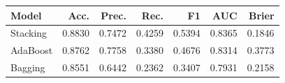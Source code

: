 \begin{tabular*}{\textwidth}{@{\extracolsep{\fill}}lrrrrrr@{}}
\toprule
Model & Acc. & Prec. & Rec. & F1 & AUC & Brier \\
\midrule
Stacking & 0.8830 & 0.7472 & 0.4259 & 0.5394 & 0.8365 & 0.1846 \\
AdaBoost & 0.8762 & 0.7758 & 0.3380 & 0.4676 & 0.8314 & 0.3773 \\
Bagging & 0.8551 & 0.6442 & 0.2362 & 0.3407 & 0.7931 & 0.2158 \\
\bottomrule
\end{tabular*}
